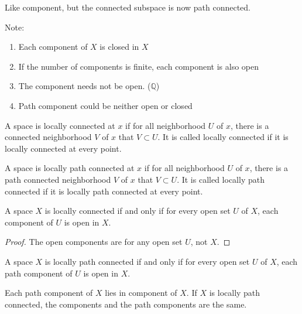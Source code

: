 \begin{definition}
    Like component, but the connected subspace is now path connected.
\end{definition}

Note: 
\begin{enumerate}
    \item Each component of $X$ is closed in $X$
    \item If the number of components is finite, each component is also open
    \item The component needs not be open. ($\mathbb{Q}$)
    \item Path component could be neither open or closed
\end{enumerate}

\begin{definition}
    A space is locally connected at $x$ if for all neighborhood $U$ of $x$, there is a connected neighborhood $V$ of $x$ that $V \subset U$. It is called locally connected if it is locally connected at every point.
\end{definition}

\begin{definition}
    A space is locally path connected at $x$ if for all neighborhood $U$ of $x$, there is a path connected neighborhood $V$ of $x$ that $V \subset U$. It is called locally path connected if it is locally path connected at every point.
\end{definition}

\begin{theorem}
A space $X$ is locally connected if and only if for every open set $U$ of $X$, each component of $U$ is open in $X$.    
\end{theorem}
\begin{proof}
    The open components are for any open set $U$, not $X$.
\end{proof}

\begin{theorem}
A space $X$ is locally path connected if and only if for every open set $U$ of $X$, each path component of $U$ is open in $X$.    
\end{theorem}

\begin{theorem}
Each path component of $X$ lies in component of $X$. If $X$ is locally path connected, the components and the path components are the same.    
\end{theorem}
















